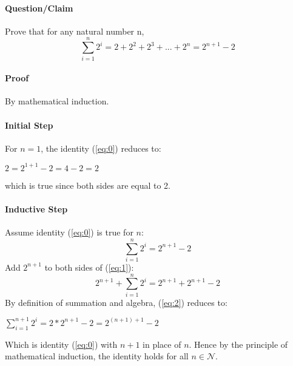 \documentclass[14pt]{extarticle}
\begin{document}
	\paragraph{Question/Claim} Prove that for any natural number n,
	\begin{equation}\label{eq:0}
	\sum\limits_{i=1}^n 2^i = 2+2^2+2^3+ ... +2^n=2^{n+1} - 2
	\end{equation}
	\paragraph{Proof} By mathematical induction.
	\paragraph{Initial Step} For $n=1$, the identity (\ref{eq:0}) reduces to:
	\begin{center}
		$2 = 2^{1+1}-2 = 4 - 2 = 2$
	\end{center}
	which is true since both sides are equal to 2. 
	\paragraph{Inductive Step} Assume identity (\ref{eq:0}) is true for $n$:
	\begin{equation}\label{eq:1}
	\sum\limits_{i=1}^n 2^i =  2^{n+1} - 2 
	\end{equation}
	Add $2^{n+1}$ to both sides of (\ref{eq:1}):
	\begin{equation}\label{eq:2}
		2^{n+1} + \sum\limits_{i=1}^n 2^i = 2^{n+1} + 2^{n+1} - 2
	\end{equation}
	By definition of summation and algebra, (\ref{eq:2}) reduces to:
	\begin{center}
		$\sum\limits_{i=1}^{n+1} 2^i = 2*2^{n+1} - 2 = 2^{(n+1)+1}-2$		
	\end{center}
	Which is identity (\ref{eq:0}) with $n+1$ in place of $n$.  Hence by the principle of mathematical induction, the identity holds for all $n \in \mathcal{N}$.
\end{document}
